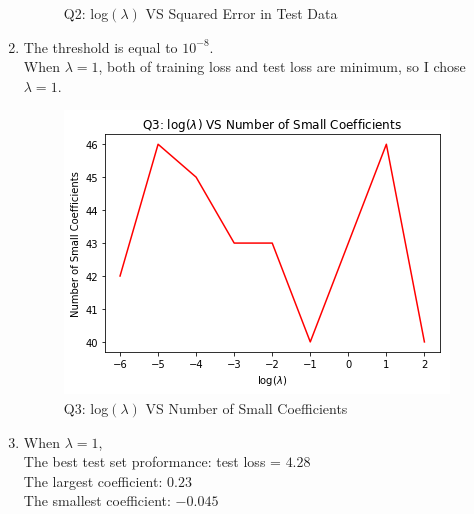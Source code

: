 \documentclass{article}
\begin{document}
\begin{enumerate}[(1)]
\begin{figure}
    \caption{Q2: log$(\lambda)$ VS Squared Error in Test Data}
    \label{fig:verticalcell}
\end{figure}
\item
The threshold is equal to $10^{-8}$.\\
When $\lambda = 1$, both of training loss and test loss are minimum, so I chose $\lambda = 1$.
\begin{figure}
\centering
        \includegraphics[totalheight=8cm]{q3.png}
    \caption{Q3: log$(\lambda)$ VS Number of Small Coefficients}
    \label{fig:verticalcell}
\end{figure}
\item 
When $\lambda = 1$,\\
The best test set proformance: test loss = $4.28$\\
The largest coefficient:  $0.23$\\
The smallest coefficient:  $-0.045$
\end{enumerate}
\end{document}
